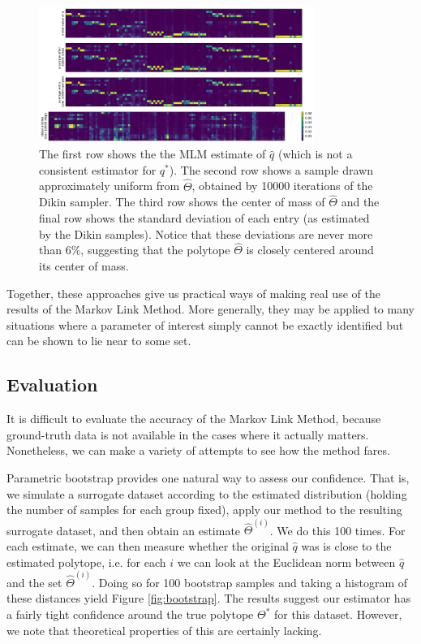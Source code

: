 \begin{figure}
\includegraphics[width=0.8\textwidth]{pics/allenavg}
\caption{\label{fig:allenoutput}The first row shows the the MLM estimate of $\hat q$ (which is not a consistent estimator for $q^*$).  The second row shows a sample drawn approximately uniform from $\hat \Theta$, obtained by 10000 iterations of the Dikin sampler.  The third row shows the center of mass of $\hat \Theta$ and the final row shows the standard deviation of each entry (as estimated by the Dikin samples).  Notice that these deviations are never more than 6\%, suggesting that the polytope $\hat \Theta$ is closely centered around its center of mass.\label{fig:allenavg}}
\end{figure}

Together, these approaches give us practical ways of making real use of the results of the Markov Link Method.  More generally, they may be applied to many situations where a parameter of interest simply cannot be exactly identified but can be shown to lie near to some set.  

\subsection{Evaluation}

It is difficult to evaluate the accuracy of the Markov Link Method, because ground-truth data is not available in the cases where it actually matters.  Nonetheless, we can make a variety of attempts to see how the method fares.

Parametric bootstrap provides one natural way to assess our confidence.  That is, we simulate a surrogate dataset according to the estimated distribution (holding the number of samples for each group fixed), apply our method to the resulting surrogate dataset, and then obtain an estimate $\hat \Theta^{(i)}$.  We do this 100 times.  For each estimate, we can then measure whether the original $\hat q$ was is close to the estimated polytope, i.e. for each $i$ we can look at the Euclidean norm between $\hat q$ and the set $\hat \Theta^{(i)}$.  Doing so for 100 bootstrap samples and taking a histogram of these distances yield Figure \ref{fig:bootstrap}.  The results suggest our estimator has a fairly tight confidence around the true polytope $\Theta^*$ for this dataset.  However, we note that theoretical properties of this are certainly lacking.

